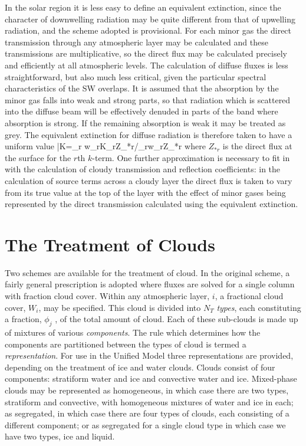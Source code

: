 \noindent
In the solar region it is less easy to define an equivalent extinction, 
since the character of 
downwelling radiation may be quite different from that of upwelling 
radiation, and the scheme 
adopted is provisional. For each minor gas the direct transmission 
through any atmospheric layer 
may be calculated and these transmissions are multiplicative, so the 
direct flux may be  calculated 
precisely and efficiently at all atmospheric levels. The calculation
of diffuse fluxes is less straightforward, but also much less critical,
given the particular spectral characteristics of the SW overlaps.
It is assumed that 
the absorption by the minor gas falls into weak and strong parts, so 
that radiation which is 
scattered into the diffuse beam will be effectively denuded in parts of 
the band where absorption 
is strong. If the remaining absorption is weak it may be treated as 
grey. The equivalent extinction 
for diffuse radiation is therefore taken to have a uniform value
\beq
\bar{K}=\sum_{r} w_{r}K_{r}Z_{*r}/\sum_{r}w_{r}Z_{*r}
\label{p2_eq38}
\eeq
where $Z_{*r}$ is the direct flux at the surface for the $r$th $k$-term. 
One further approximation is 
necessary to fit in with the calculation of cloudy transmission and 
reflection coefficients: in the 
calculation of source terms across a cloudy layer the direct flux is 
taken to vary from its true value 
at the top of the layer with the effect of minor gases being 
represented by the direct transmission 
calculated using the equivalent extinction.\\

\section{The Treatment of Clouds}

Two schemes are available for the treatment of cloud. In the original scheme,
a fairly general prescription is adopted where fluxes are solved for a single
column with fraction cloud cover.
Within any atmospheric layer, 
$i$, a fractional cloud cover, $W_{i}$, may be specified. This cloud is 
divided into $N_{T}$ {\em types}, each 
constituting a fraction, $\phi_{j}$ , of the total amount of cloud. 
Each of these sub-clouds is made up of 
mixtures of various {\em components}. The rule which determines how the 
components are partitioned 
between the types of cloud is termed a {\em representation}. For use in the 
Unified Model three 
representations are provided, depending on the treatment of ice and 
water clouds. Clouds consist 
of four components: stratiform water and ice and convective water and 
ice. Mixed-phase clouds 
may be represented as homogeneous, in which case there are two types, 
stratiform and convective, 
with homogeneous mixtures of water and ice in each;  as segregated, 
in which case there are 
four types of clouds, each consisting of a different component; or as segregated for a single cloud type in which case we have two types, ice and liquid.\\

